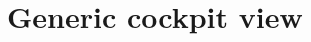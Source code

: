 \documentclass[Orbiter User Manual.tex]{subfiles}
\begin{document}
\section{Generic cockpit view}

\end{document}
